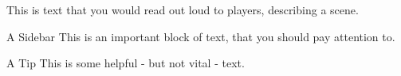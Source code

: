 \begin{RpgNarration}[color=blue!30!white]
	This is text that you would read out loud to players, describing a scene.
\end{RpgNarration}

\begin{RpgSidebar}{A Sidebar}
	This is an important block of text, that you should pay attention to.
\end{RpgSidebar}

\begin{RpgTip}{A Tip}
	This is some helpful - but not vital - text.
\end{RpgTip}
